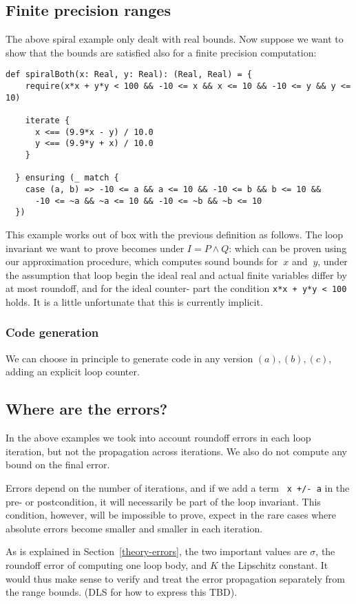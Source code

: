 \subsection{Finite precision ranges}
The above spiral example only dealt with real bounds. Now suppose we want to show that the bounds
are satisfied also for a finite precision computation:
\begin{lstlisting}
def spiralBoth(x: Real, y: Real): (Real, Real) = {
    require(x*x + y*y < 100 && -10 <= x && x <= 10 && -10 <= y && y <= 10)

    iterate {
      x <== (9.9*x - y) / 10.0
      y <== (9.9*y + x) / 10.0
    }

  } ensuring (_ match {
    case (a, b) => -10 <= a && a <= 10 && -10 <= b && b <= 10 &&
      -10 <= ~a && ~a <= 10 && -10 <= ~b && ~b <= 10
  })
\end{lstlisting}

This example works out of box with the previous definition as follows.
The loop invariant we want to prove becomes under $I = P \wedge Q$:
which can be proven using our approximation procedure, which computes sound
bounds for $~x$ and $~y$, under the assumption that loop begin the ideal real
and actual finite variables differ by at most roundoff, and for the ideal counter-
part the condition \lstinline{x*x + y*y < 100} holds.
It is a little unfortunate that this is currently implicit.


\subsubsection{Code generation}
We can choose in principle to generate code in any version $(a), (b), (c)$,
adding an explicit loop counter.



\subsection{Where are the errors?}
In the above examples we took into account roundoff errors in each loop iteration,
but not the propagation across iterations. We also do not compute any bound on the final error.

Errors depend on the number of iterations, and if we add a term \lstinline{ x +/- a}
in the pre- or postcondition, it will necessarily be part of the loop invariant.
This condition, however, will be impossible to prove, expect in the rare cases where
absolute errors become smaller and smaller in each iteration.

As is explained in Section~\ref{theory-errors}, the two important values are $\sigma$,
the roundoff error of computing one loop body, and $K$ the Lipschitz constant.
It would thus make sense to verify and treat the error propagation separately from the
range bounds. (DLS for how to express this TBD).
